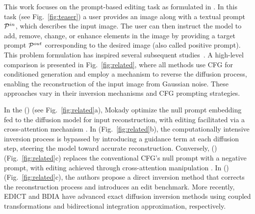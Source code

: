 {\modified{}This work focuses} on the prompt-based editing task as formulated in \cite{mokady2023null}. In this task (see Fig.~\ref{fig:teaser}) a user provides an image along with a textual prompt  ${{\mathcal{P}}^{in}}$, which describes the input image. The user can then instruct the model to add, remove, change, or enhance elements in the image by providing a target prompt ${{\mathcal{P}}^{out}}$ corresponding to the desired image (also called positive prompt). This problem formulation has inspired several subsequent studies~\cite{mokady2023null,parmar2023zero,tumanyan2023plug,ju2023direct}.
{\modified{}A high-level comparison is presented}  in Fig.~\ref{fig:related}, where all methods use CFG for conditioned generation and employ a mechanism to reverse the diffusion process, enabling the reconstruction of the input image from Gaussian noise. These approaches vary in their inversion mechanisms and CFG prompting strategies.

In the \nulltextlong{} (\nulltext) (see Fig.~\ref{fig:related}a), Mokady \etal{} \cite{mokady2023null} optimize the null prompt embedding fed to the diffusion model for input reconstruction, with editing facilitated via a cross-attention mechanism \cite{hertz2023prompt}. In \ptopzerolong{} \cite{parmar2023zero} (Fig.~\ref{fig:related}b), the computationally intensive inversion process is bypassed by introducing a guidance term at each diffusion step, steering the model toward accurate reconstruction. Conversely, \negativelong{} (\negative) \cite{miyake2023negative} (Fig.~\ref{fig:related}c) replaces the conventional CFG's null prompt with a negative prompt, with editing achieved through cross-attention manipulation \cite{hertz2023prompt, mokady2023null}. In \directinversionlong{} (\directinversion) \cite{ju2023direct} (Fig.~\ref{fig:related}c), the authors propose a direct inversion method that corrects the reconstruction process and introduces an edit benchmark. 
More recently, EDICT \cite{wallace2023edict} and BDIA \cite{zhang2024exact} have advanced exact diffusion inversion methods using coupled transformations and bidirectional integration approximation, respectively.

